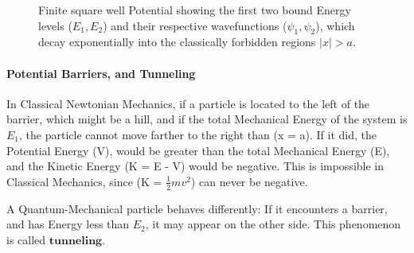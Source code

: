 \documentclass[a4paper, 10pt, onepage]{elegantbook}
\begin{document}
{\begin{figure}[htbp]
\caption{Finite square well Potential showing the first two bound Energy levels ($E_1, E_2$) and their respective 
wavefunctions ($\psi_1, \psi_2$), which decay exponentially into the classically forbidden regions $|x| > a$.}
\end{figure}

\paragraph{Potential Barriers, and Tunneling}
\noindent

In Classical Newtonian Mechanics, if a particle is located to the left of the barrier, which might be a hill, and if 
the total Mechanical Energy of the system is $E_1$, the particle cannot move farther to the right than (x = a). If it 
did, the Potential Energy (V), would be greater than the total Mechanical Energy (E), and the Kinetic Energy (K = E - 
V) would be negative. This is impossible in Classical Mechanics, since (K = $\frac{1}{2} mv^2$) can never be negative.  

A Quantum-Mechanical particle behaves differently: If it encounters a barrier, and has Energy less than 
$E_2$, it may appear on the other side. This phenomenon is called $\mathbf{\textbf{tunneling}}$.  

\begin{figure}[htbp]
\centering
{}
\end{figure}}
\end{document}
